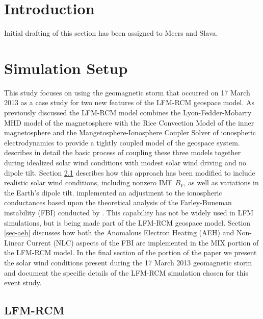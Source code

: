 \documentclass[draft,jgrga]{agutex}
\begin{document}
\begin{article}

%
%

\section{Introduction}

Initial drafting of this section has been assigned to Meers and Slava.

\section{Simulation Setup}
\label{sec-model-sims}
This study focuses on using the geomagnetic storm that occurred on 17 March 2013 as a case study for two new features of the LFM-RCM geospace model.   As previously discussed the LFM-RCM model combines the Lyon-Fedder-Mobarry MHD model of the magnetosphere with the Rice Convection Model of the inner magnetosphere and the Mangetosphere-Ionosphere Coupler Solver of ionospheric electrodynamics to provide a tightly coupled model of the geospace system. \cite{Pembroke:2012gc} describes in detail the basic process of coupling these three models together during idealized solar wind conditions with modest solar wind driving and no dipole tilt.  Section \ref{sec-lfm-rcm} describes how this approach has been modified to include realistic solar wind conditions, including nonzero IMF $B_Y$, as well as variations in the Earth's dipole tilt.  \cite{2005GeoRL..3222101M} implemented an adjustment to the ionospheric conductances based upon the theoretical analysis of the Farley-Buneman instability (FBI) conducted by \cite{2003JGRA..108.1350D}.  This capability has not be widely used in LFM simulations, but is being made part of the LFM-RCM geospace model.  Section \ref{sec-aeh} discusses how both the Anomalous Electron Heating (AEH) and Non-Linear Current (NLC) aspects of the FBI are implemented in the MIX portion of the LFM-RCM model.  In the final section of the portion of  the paper we present the solar wind conditions present during the 17 March 2013 geomagnetic storm and document the specific details of the LFM-RCM simulation chosen for this event study.

\subsection{LFM-RCM}
\label{sec-lfm-rcm}


\end{article}
\end{document}
